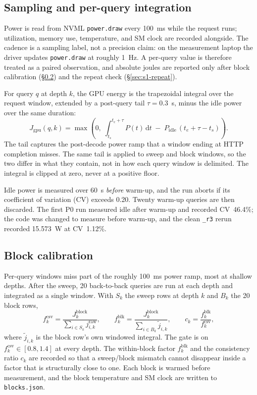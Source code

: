 \documentclass[a4paper,fleqn]{cas-sc}
\begin{document}
\subsection{Sampling and per-query integration}

Power is read from NVML \texttt{power.draw} every 100~ms while the request runs; utilization,
memory use, temperature, and SM clock are recorded alongside. The cadence is a sampling label,
not a precision claim: on the measurement laptop the driver updates \texttt{power.draw} at
roughly 1~Hz. A per-query value is therefore treated as a paired observation, and absolute
joules are reported only after block calibration (\S\ref{sec:s1-block}) and the repeat check
(\S\ref{sec:s1-repeat}).

For query $q$ at depth $k$, the GPU energy is the trapezoidal integral over the request window,
extended by a post-query tail $\tau=0.3$~s, minus the idle power over the same duration:
\begin{equation}
J_{\mathrm{gpu}}(q,k)=\max\!\left(0,\;
\int_{t_s}^{t_e+\tau} P(t)\,\mathrm{d}t
\;-\;P_{\mathrm{idle}}\,(t_e+\tau-t_s)\right).
\label{eq:window}
\end{equation}
The tail captures the post-decode power ramp that a window ending at HTTP completion misses.
The same tail is applied to sweep and block windows, so the two differ in what they contain, not
in how each query window is delimited. The integral is clipped at zero, never at a positive
floor.

Idle power is measured over 60~s \emph{before} warm-up, and the run aborts if its coefficient
of variation (CV) exceeds 0.20. Twenty warm-up queries are then discarded. The first P0 run
measured idle after warm-up and recorded CV~46.4\%; the code was changed to measure before
warm-up, and the clean \texttt{\_r3} rerun recorded 15.573~W at CV~1.12\%.

\subsection{Block calibration}\label{sec:s1-block}

Per-query windows miss part of the roughly 100~ms power ramp, most at shallow depths. After the
sweep, 20 back-to-back queries are run at each depth and integrated as a single window. With
$S_k$ the sweep rows at depth $k$ and $B_k$ the 20 block rows,
\begin{equation}
f^{\mathrm{csv}}_k=\frac{J^{\mathrm{block}}_k}{\sum_{i\in S_k} j^{\mathrm{raw}}_{i,k}},
\qquad
f^{\mathrm{blk}}_k=\frac{J^{\mathrm{block}}_k}{\sum_{i\in B_k} \tilde{j}_{i,k}},
\qquad
c_k=\frac{f^{\mathrm{blk}}_k}{f^{\mathrm{csv}}_k},
\label{eq:factor}
\end{equation}
where $\tilde{j}_{i,k}$ is the block row's own windowed integral. The gate is on
$f^{\mathrm{csv}}_k\in[0.8,1.4]$ at every depth. The within-block factor $f^{\mathrm{blk}}_k$ and
the consistency ratio $c_k$ are recorded so that a sweep/block mismatch cannot disappear inside
a factor that is structurally close to one. Each block is warmed before measurement, and the
block temperature and SM clock are written to \texttt{blocks.json}.
\end{document}

